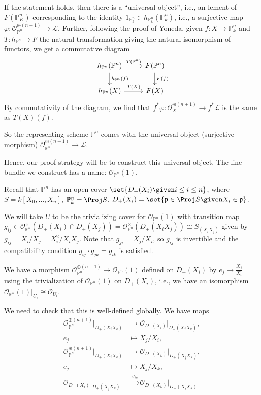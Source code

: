 If the statement holds, then there is a \enquote{universal object}, i.e., an lement
of $F(\mathbb{P}^n_K)$ corresponding to the identity $1_{\mathbb{P}^n_k} \in h_{\mathbb{P}^n_k}(\mathbb{P}^n_k)$,
i.e., a surjective map $\varphi\colon\mathcal{O}_{\mathbb{P}^n}^{\oplus(n+1)}\to \mathcal{L}$. Further, following the proof of
Yoneda, given $f\colon X\to \mathbb{P}^n_k$ and $T\colon h_{\mathbb{P}^n} \to F$ the natural transformation
giving the natural isomorphism of functors, we get a commutative diagram
\[\begin{tikzcd}
	h_{\mathbb{P}^n}(\mathbb{P}^n)\ar[d, "h_{\mathbb{P}^n}(f)"]\ar[r, "T(\mathbb{P}^n)"] & F(\mathbb{P}^n)\ar[d, "F(f)"]\\
	h_{\mathbb{P}^n}(X)\ar[r, "T(X)"] & F(X)
\end{tikzcd}\]
By commutativity of the diagram, we find that $f^*\varphi\colon \mathcal{O}_X^{\oplus(n+1)}\to f^*\mathcal{L}$
is the same as $T(X)(f)$.

So the representing scheme $\mathbb{P}^n$ comes with the universal object
(surjective morphism) $\mathcal{O}_{\mathbb{P}^n}^{\otimes(n+1)}\to \mathcal{L}$.

Hence, our proof strategy will be to construct this universal object. The
line bundle we construct has a name: $\mathcal{O}_{\mathbb{P}^n}(1)$.

Recall that $\mathbb{P}^n$ has an open cover $\set{D_+(X_i)\given i\leq i\leq n}$,
where $S = k[X_0, \ldots, X_n]$, $\mathbb{P}_k^n = \Proj S$,
$D_+(X_i) = \set{\mathfrak{p} \in\Proj S\given X_i \in \mathfrak{p}}$.

We will take $U$ to be the trivializing cover for $\mathcal{O}_{\mathbb{P}^n}(1)$
with transition map $g_{ij} \in \mathcal{O}_{\mathbb{P}^n}^\times(D_+(X_i)\cap D_+(X_j)) = \mathcal{O}_{\mathbb{P}^n}^\times(D_+(X_iX_j)) \cong S_{(X_iX_j)}$
given by $g_{ij} = X_i/X_j = X_i^2/X_iX_j$. Note that $g_{ji} = X_j/X_i$, so $g_{ij}$
is invertible and the compatibility condition $g_{ij}\cdot g_{jk} = g_{ik}$ is
satisfied.

We have a morphism $\mathcal{O}_{\mathbb{P}^n}^{\oplus(n+1)}\to \mathcal{O}_{\mathbb{P}^n}(1)$
defined on $D_+(X_i)$ by $e_j\mapsto \frac{X_j}{X_i}$ using the trivialization of
$\mathcal{O}_{\mathbb{P}^n}(1)$ on $D_+(X_i)$, i.e., we have an isomorphism
$\mathcal{O}_{\mathbb{P}^n}(1)|_{U_i}\cong \mathcal{O}_{U_i}$.

We need to check that this is well-defined globally. We have maps
\begin{align*}
	\mathcal{O}_{\mathbb{P}^n}^{\oplus(n+1)}|_{D_+(X_iX_k)}&\to \mathcal{O}_{D_+(X_i)}|_{D_+(X_jX_k)},\\
	e_j&\mapsto X_j/X_i,\\
	\mathcal{O}_{\mathbb{P}^n}^{\oplus(n+1)}|_{D_+(X_iX_k)}&\to \mathcal{O}_{D_+(X_k)}|_{D_+(X_jX_k)},\\
	e_j &\mapsto X_j/X_k,\\
	\mathcal{O}_{D_+(X_i)}|_{D_+(X_jX_k)} &\stackrel{\cdot g_{ik}}{\longrightarrow} \mathcal{O}_{D_+(X_k)}|_{D_+(X_iX_k)}
\end{align*}

